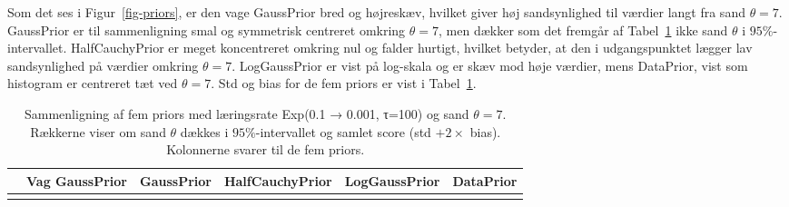 \documentclass[
  10pt,
  a4paper,
]{scrbook}
\begin{document}
Som det ses i Figur~\ref{fig-priors}, er den vage GaussPrior bred og
højreskæv, hvilket giver høj sandsynlighed til værdier langt fra sand
\(\theta=7\). GaussPrior er til sammenligning smal og symmetrisk
centreret omkring \(\theta=7\), men dækker som det fremgår af
Tabel~\ref{tbl-prior-sammenligning} ikke sand \(\theta\) i
\(95\%\)-intervallet. HalfCauchyPrior er meget koncentreret omkring nul
og falder hurtigt, hvilket betyder, at den i udgangspunktet lægger lav
sandsynlighed på værdier omkring \(\theta=7\). LogGaussPrior er vist på
log-skala og er skæv mod høje værdier, mens DataPrior, vist som
histogram er centreret tæt ved \(\theta=7\). Std og bias for de fem
priors er vist i Tabel~\ref{tbl-prior-sammenligning}.

\begin{longtable}[]{@{}
  >{\raggedright\arraybackslash}p{}
  >{\centering\arraybackslash}p{}
  >{\centering\arraybackslash}p{}
  >{\centering\arraybackslash}p{}
  >{\centering\arraybackslash}p{}
  >{\centering\arraybackslash}p{}@{}}
\caption{Sammenligning af fem priors med læringsrate Exp(0.1 → 0.001,
τ=100) og sand \(\theta = 7\). Rækkerne viser om sand \(\theta\) dækkes
i \(95\%\)-intervallet og samlet score (std \(+ 2\times\) bias).
Kolonnerne svarer til de fem
priors.}\label{tbl-prior-sammenligning}\tabularnewline
\toprule\noalign{}
\begin{minipage}[b]{\linewidth}\raggedright
\end{minipage} & \begin{minipage}[b]{\linewidth}\centering
Vag GaussPrior
\end{minipage} & \begin{minipage}[b]{\linewidth}\centering
GaussPrior
\end{minipage} & \begin{minipage}[b]{\linewidth}\centering
HalfCauchyPrior
\end{minipage} & \begin{minipage}[b]{\linewidth}\centering
LogGaussPrior
\end{minipage} & \begin{minipage}[b]{\linewidth}\centering
DataPrior
\end{minipage} \\
\midrule\noalign{}
\endfirsthead
\toprule\noalign{}

\end{longtable}
\end{document}

